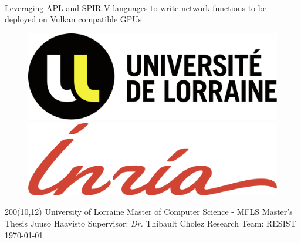 \documentclass{IEEEtran}
\begin{document}
\begin{titlepage}
    $ $ %
    \vspace{7cm}
    \begin{center}
        \huge{Leveraging APL and SPIR-V languages to write network functions to be deployed on Vulkan compatible GPUs}
    \end{center}    
    
    \begin{figure}[ht]
        \centering
        \begin{minipage}[b]{0.25\textwidth}
            \includegraphics[width=\textwidth]{ul.png}
        \end{minipage}
        \quad \quad %
        \begin{minipage}[b]{0.25\textwidth}
            \includegraphics[width=\textwidth]{inria.png}
        \end{minipage}
    \end{figure}
    
    \begin{textblock}{200}(10,12)%
    \obeylines
    \setlength{\parskip}{0cm}
        University of Lorraine
        Master of Computer Science - MFLS
        Master's Thesis
        Juuso Haavisto
        Supervisor: \textit{Dr.} Thibault Cholez
        Research Team: RESIST
        \today
    \end{textblock}%
    
\end{titlepage}

\tableofcontents

\newpage
\end{document}
